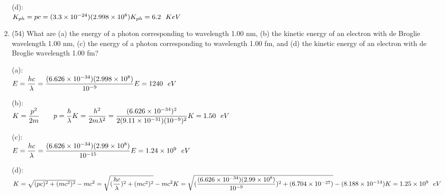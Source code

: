 \documentclass[fleqn]{article}
\begin{document}
\begin{enumerate}
      \textcolor{hwColor}{
        (d): \\
        $
          K_{ph}=pc=(3.3 \times 10^{-24})(2.998 \times 10^8) \\
          \\
          K_{ph}=6.2 ~~ KeV
        $
      }

    \item (54) What are (a) the energy of a photon corresponding to wavelength 1.00 nm, (b) the kinetic energy of an electron with de
    Broglie wavelength 1.00 nm, (c) the energy of a photon corresponding to wavelength 1.00 fm, and (d) the kinetic energy of an
    electron with de Broglie wavelength 1.00 fm?

      \textcolor{hwColor}{
        (a): \\
        $
          E=\dfrac{hc}{\lambda}=\dfrac{(6.626 \times 10^{-34})(2.998 \times 10^8)}{10^{-9}} \\
          \\
          E=1240 ~~ eV \\
        $
      }

      \textcolor{hwColor}{
        (b): \\
        $
          K=\dfrac{p^2}{2m} ~~~~~~ p=\dfrac{h}{\lambda} \\
          \\
          K=\dfrac{h^2}{2m \lambda^2}=\dfrac{(6.626 \times 10^{-34})^2}{2(9.11 \times 10^{-31})(10^{-9})^2} \\
          \\
          K=1.50 ~~ eV \\
        $
      }

      \textcolor{hwColor}{
        (c): \\
        $
          E=\dfrac{hc}{\lambda}=\dfrac{(6.626 \times 10^{-34})(2.99 \times 10^8)}{10^{-15}} \\
          \\
          E=1.24 \times 10^9 ~~ eV \\
        $
      }

      \textcolor{hwColor}{
        (d): \\
        $
          K=\sqrt{(pc)^2+(mc^2)^2}-mc^2=\sqrt{(\dfrac{hc}{\lambda})^2+(mc^2)^2}-mc^2 \\
          \\
          K=\sqrt{(\dfrac{(6.626 \times 10^{-34})(2.99 \times 10^8)}{10^{-9}})^2+(6.704 \times 10^{-27})}-(8.188 \times 10^{-14}) \\
          \\
          K=1.25 \times 10^9 ~~ eV
        $
      }




\end{enumerate}
\end{document}
